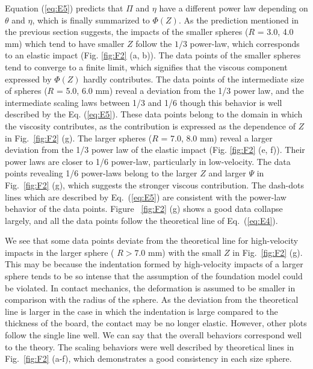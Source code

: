\documentclass[default,iicol,10pt]{sn-jnl}%
\theoremstyle{thmstyleone}%
\theoremstyle{thmstyletwo}%
\theoremstyle{thmstylethree}%
\begin{document}
Equation (\ref{eq:E5}) predicts that $\Pi$ and $\eta$ have a different power law depending on $\theta$ and $\eta$, which is finally summarized to $\Phi(Z)$. As the prediction mentioned in the previous section suggests, the impacts of the smaller spheres ($R$ = 3.0, 4.0 mm) which tend to have smaller $Z$ follow the $1/3$ power-law, which corresponds to an elastic impact (Fig. \ref{fig:F2} (a, b)). The data points of the smaller spheres tend to converge to a finite limit, which signifies that the viscous component expressed by $\Phi(Z)$ hardly contributes. The data points of the intermediate size of spheres ($R$ = 5.0, 6.0 mm) reveal a deviation from the 1/3 power law, and the intermediate scaling laws between 1/3 and 1/6 though this behavior is well described by the Eq. (\ref{eq:E5}). These data points belong to the domain in which the viscosity contributes, as the contribution is expressed as the dependence of $Z$ in Fig.~\ref{fig:F2} (g). The larger spheres ($R$ = 7.0, 8.0 mm) reveal a larger deviation from the 1/3 power law of the elastic impact  (Fig. \ref{fig:F2} (e, f)). Their power laws are closer to 1/6 power-law, particularly in low-velocity. The data points revealing 1/6 power-laws belong to the larger $Z$ and larger $\Psi$ in Fig.~\ref{fig:F2} (g), which suggests the stronger viscous contribution. The dash-dots lines which are described by Eq.~(\ref{eq:E5}) are consistent with the power-law behavior of the data points. Figure ~\ref{fig:F2} (g) shows a good data collapse largely, and all the data points follow the theoretical line of Eq.~(\ref{eq:E4}).

We see that some data points deviate from the theoretical line for high-velocity impacts in the larger sphere ( $R >  7.0$ mm) with the small $Z$ in Fig.~\ref{fig:F2} (g). This may be because the indentation formed by high-velocity impacts of a larger sphere tends to be so intense that the assumption of the foundation model could be violated. In contact mechanics, the deformation is assumed to be smaller in comparison with the radius of the sphere. As the deviation from the theoretical line is larger in the case in which the indentation is large compared to the thickness of the board, the contact may be no longer elastic. However, other plots follow the single line well. We can say that the overall behaviors correspond well to the theory. The scaling behaviors were well described by theoretical lines in Fig.~\ref{fig:F2} (a-f), which demonstrates a good consistency in each size sphere.
\end{document}
